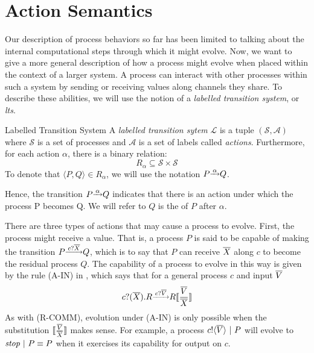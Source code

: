 \section{Action Semantics}\label{secactionsemantics}
Our description of process behaviors so far has been limited to talking about the internal computational steps through which it might evolve.  
Now, we want to give a more general description of how a process might evolve when placed within the context of a larger system.  
A process can interact with other processes within such a system by sending or receiving values along channels they share.  
To describe these abilities, we will use the notion of a \emph{labelled transition system}, or \emph{lts}.

\begin{definition}{Labelled Transition System}
	A \emph{labelled transition sytem} $\mathcal{L}$ is a tuple $(\mathcal{S}, \mathcal{A})$ 
where $\mathcal{S}$ is a set of processes and $\mathcal{A}$ is a set of labels called \emph{actions}.  
Furthermore, for each action $\alpha$, there is a binary relation:
	\[
		R_{\alpha} \subseteq \mathcal{S} \times \mathcal{S}
	\]
	To denote that $\langle P,Q\rangle \in R_{\alpha}$, we will use the notation $P \overset{\underrightarrow{\ {\alpha}\ }}{} Q$.
\end{definition}
Hence, the transition $P \overset{\underrightarrow{\ {\alpha}\ }}{} Q$ indicates that there is an action under which the process P becomes Q.  
We will refer to $Q$ is the  of $P$ after $\alpha$.

There are three types of actions that may cause a process to evolve.  
First, the process might receive a value.  
That is, a process $P$ is said to be capable of making the transition $P \overset{\underrightarrow{\ { \ensuremath{{c}?{\overline{X}}} }\ }}{} Q$, which is to say that $P$ can receive $\overline{X}$ along $c$ to become the residual process $Q$.  
The capability of a process to evolve in this way is given by the rule (A-IN) in , which says that for a general process $c$ and input $\overline{V}$
\[
	\receive{c}{\tuple{X}}R \evolves{\receives{c}{\tuple{V}}} R\subst{\tuple{V}}{\tuple{X}}
\]
As with (R-COMM), evolution under (A-IN) is only possible when the substitution $\subst{\tuple{V}}{\tuple{X}}$ makes sense.
For example, a process ${c}!\langle{ \ensuremath{\overline{V}} }\rangle \ |\  P$ will evolve to $\mbox{\emph{stop}} \ |\  P \equiv P$ when it exercises its capability for output on $c$.  

